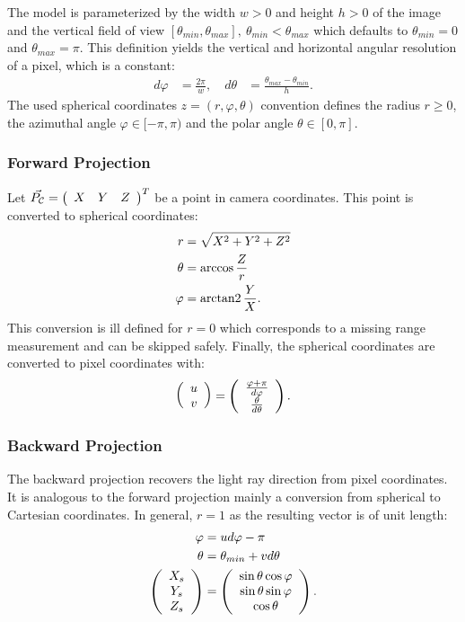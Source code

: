 The model is parameterized by the width $w > 0$ and height $h > 0$ of the image and the vertical field of view $[\theta_{min}, \theta_{max}],~\theta_{min} < \theta_{max}$ which defaults to $\theta_{min} = 0$ and $\theta_{max} = \pi$.
This definition yields the vertical and horizontal angular resolution of a pixel, which is a constant:
\begin{equation}
\label{eq:equi_angular_resolution}
\begin{aligned}
    d\varphi &= \frac{2 \pi}{w}, \quad
    d\theta &= \frac{\theta_{max} - \theta_{min}}{h} \text{.}
\end{aligned}
\end{equation}
The used spherical coordinates $z = (r, \varphi, \theta)$ convention defines the radius $r \ge 0$, the azimuthal angle $\varphi \in [-\pi, \pi)$ and the polar angle $\theta \in [0, \pi]$.

\subsubsection*{Forward Projection}

Let $\vec{P_\mathcal{C}} = \left(\begin{array}{ccc} X & Y & Z \end{array}\right)^T$ be a point in camera coordinates.
This point is converted to spherical coordinates:
\begin{equation}
\begin{aligned}
    r       &= \sqrt{X^2 + Y^2 + Z^2} \\
    \theta  &= \arccos{\frac{Z}{r}} \\
    \varphi &= \operatorname{arctan2}{\frac{Y}{X}}\text{.}
\end{aligned}
\end{equation}
This conversion is ill defined for $r = 0$ which corresponds to a missing range measurement and can be skipped safely.
Finally, the spherical coordinates are converted to pixel coordinates with:
\begin{equation}
\begin{aligned} 
    \left(\begin{array}{c} u \\ v \end{array}\right) = \left(\begin{array}{c} \frac{\varphi + \pi}{d\varphi} \\ \frac{\theta}{d\theta} \end{array}\right)\text{.}
\end{aligned}
\end{equation}

\subsubsection*{Backward Projection}

The backward projection recovers the light ray direction from pixel coordinates.
It is analogous to the forward projection mainly a conversion from spherical to Cartesian coordinates.
In general, $r = 1$ as the resulting vector is of unit length:
\begin{equation}
\begin{aligned}
    \varphi &= u d\varphi - \pi \\
    \theta &= \theta_{min} + v d\theta \\
    \left(\begin{array}{c} X_s \\ Y_s \\ Z_s \end{array}\right) &= \left(\begin{array}{c} \sin \theta \cos \varphi \\ \sin \theta \sin \varphi \\ \cos \theta \end{array}\right)\text{.}
\end{aligned}
\end{equation}

